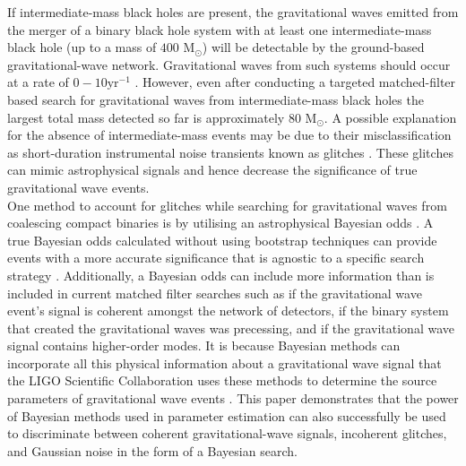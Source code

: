 \documentclass[%
preprint,
 amsmath,amssymb,
 aps,
]{revtex4}
\newcommand{\msun}{{\sc M${}_\odot$}\xspace}
\begin{document}
If intermediate-mass black holes are present, the gravitational waves emitted from the merger of a binary black hole system with at least one intermediate-mass black hole (up to a mass of $400$ \msun) will be detectable by the ground-based gravitational-wave network. Gravitational waves from such systems should occur at a rate of $0-10\text{yr}^{-1}$ \cite{fregeau2006imbhbRatePrediction, mandel2008rates,rodriguez2015bbhRatePredictions}.  However, even after conducting a targeted matched-filter based search for gravitational waves from intermediate-mass black holes the largest total mass detected so far is approximately $80$ \msun \cite{imbhbSearch2014, ligo_imbh_search, abbott2019gwtc}. A possible explanation for the absence of intermediate-mass events may be due to their misclassification as short-duration instrumental noise transients known as glitches \cite{glitch_in_fifth_ligo_run, bayeswave, improving_dq_in_early_runs, ligo_glitch_gw150914, pycbc_short_duration_transients, pe_with_glitch, blip_glitches}. These glitches can mimic astrophysical signals and hence decrease the significance of true gravitational wave events. \\

One method to account for glitches while searching for gravitational waves from coalescing compact binaries is by utilising an astrophysical Bayesian odds  \cite{bci, BCR1, BCR2, bcr_gw151216, bayesian_odds}. A true Bayesian odds calculated without using bootstrap techniques can provide events with a more accurate significance that is agnostic to a specific search strategy \cite{BCR2, bcr_gw151216,  bayesian_odds}. Additionally, a Bayesian odds can include more information than is included in current matched filter searches such as if the gravitational wave event's signal is coherent amongst the network of detectors, if the binary system that created the gravitational waves was precessing, and if the gravitational wave signal contains higher-order modes.  It is because Bayesian methods can incorporate all this physical information about a gravitational wave signal that the LIGO Scientific Collaboration uses these methods to determine the source parameters of gravitational wave events \cite{abbott2016ligo, abbott2019gwtc}. This paper demonstrates that the power of Bayesian methods used in parameter estimation can also successfully be used to discriminate between coherent gravitational-wave signals, incoherent glitches, and Gaussian noise in the form of a Bayesian search. \\
\end{document}
